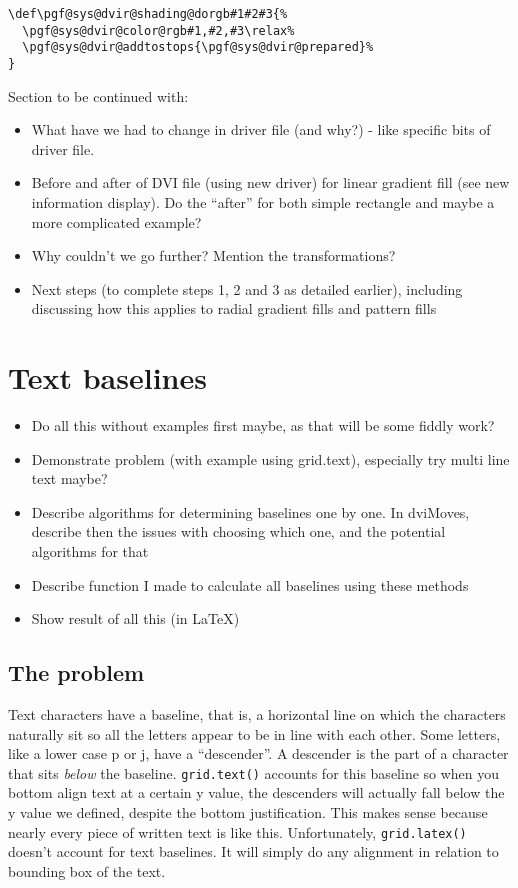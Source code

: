 \documentclass[]{article}
\begin{document}
\begin{verbatim}
\def\pgf@sys@dvir@shading@dorgb#1#2#3{%
  \pgf@sys@dvir@color@rgb#1,#2,#3\relax%
  \pgf@sys@dvir@addtostops{\pgf@sys@dvir@prepared}%
}
\end{verbatim}

Section to be continued with:

\begin{itemize}
\item
  What have we had to change in driver file (and why?) - like specific
  bits of driver file.
\item
  Before and after of DVI file (using new driver) for linear gradient
  fill (see new information display). Do the ``after'' for both simple
  rectangle and maybe a more complicated example?
\item
  Why couldn't we go further? Mention the transformations?
\item
  Next steps (to complete steps 1, 2 and 3 as detailed earlier),
  including discussing how this applies to radial gradient fills and
  pattern fills
\end{itemize}

\newpage{}

\section{Text baselines}\label{text-baselines}

\begin{itemize}
\item
  Do all this without examples first maybe, as that will be some fiddly
  work?
\item
  Demonstrate problem (with example using grid.text), especially try
  multi line text maybe?
\item
  Describe algorithms for determining baselines one by one. In dviMoves,
  describe then the issues with choosing which one, and the potential
  algorithms for that
\item
  Describe function I made to calculate all baselines using these
  methods
\item
  Show result of all this (in LaTeX)
\end{itemize}

\subsection{The problem}\label{the-problem}

Text characters have a baseline, that is, a horizontal line on which the
characters naturally sit so all the letters appear to be in line with
each other. Some letters, like a lower case p or j, have a
``descender''. A descender is the part of a character that sits
\emph{below} the baseline. \texttt{grid.text()} accounts for this
baseline so when you bottom align text at a certain y value, the
descenders will actually fall below the y value we defined, despite the
bottom justification. This makes sense because nearly every piece of
written text is like this. Unfortunately, \texttt{grid.latex()} doesn't
account for text baselines. It will simply do any alignment in relation
to bounding box of the text.
\end{document}
